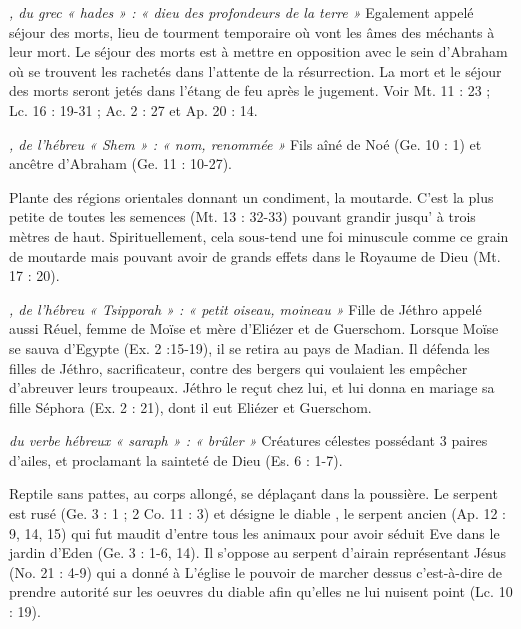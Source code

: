 \begin{multicols}{2}
\textit{, du grec « hades » : « dieu des profondeurs de la terre »}\newline
Egalement appelé séjour des morts, lieu de tourment temporaire où vont les âmes des méchants à leur mort. Le séjour des morts est à mettre en opposition avec le sein d'Abraham où se trouvent les rachetés dans l’attente de la résurrection. La mort et le séjour des morts seront jetés dans l'étang de feu après le jugement. Voir Mt. 11 : 23 ; Lc. 16 : 19-31 ; Ac. 2 : 27 et Ap. 20 : 14.

\textit{, de l'hébreu « Shem » : « nom, renommée »}\newline
Fils aîné de Noé (Ge. 10 : 1) et ancêtre d'Abraham (Ge. 11 : 10-27).

\textit{}\newline
Plante des régions orientales donnant un condiment, la moutarde. C'est la plus petite de toutes les semences (Mt. 13 : 32-33) pouvant grandir jusqu' à trois mètres de haut. Spirituellement, cela sous-tend une foi minuscule comme ce grain de moutarde mais pouvant avoir de grands effets dans le Royaume de Dieu (Mt. 17 : 20).

\textit{, de l'hébreu « Tsipporah » : « petit oiseau, moineau »}\newline
Fille de Jéthro appelé aussi Réuel, femme de Moïse et mère d'Eliézer et de Guerschom. Lorsque Moïse se sauva d'Egypte (Ex. 2 :15-19), il se retira au pays de Madian. Il défenda les filles de Jéthro, sacrificateur, contre des bergers qui voulaient les empêcher d'abreuver leurs troupeaux. Jéthro le reçut chez lui, et lui donna en mariage sa fille Séphora (Ex. 2 : 21), dont il eut Eliézer et Guerschom.

\textit{du verbe hébreux « saraph » : « brûler »}\newline
Créatures célestes possédant 3 paires d'ailes, et proclamant la sainteté de Dieu (Es. 6 : 1-7).

\textit{}\newline
Reptile sans pattes, au corps allongé, se déplaçant dans la poussière. Le serpent est rusé (Ge. 3 : 1 ; 2 Co. 11 : 3) et désigne le diable , le serpent ancien (Ap. 12 : 9, 14, 15) qui fut maudit d'entre tous les animaux pour avoir séduit Eve dans le jardin d'Eden (Ge. 3 : 1-6, 14). Il s'oppose au serpent d'airain représentant Jésus (No. 21 : 4-9) qui a donné à L'église le pouvoir de marcher dessus c'est-à-dire de prendre autorité sur les oeuvres du diable afin qu'elles ne lui nuisent point (Lc. 10 : 19).


\end{multicols}

